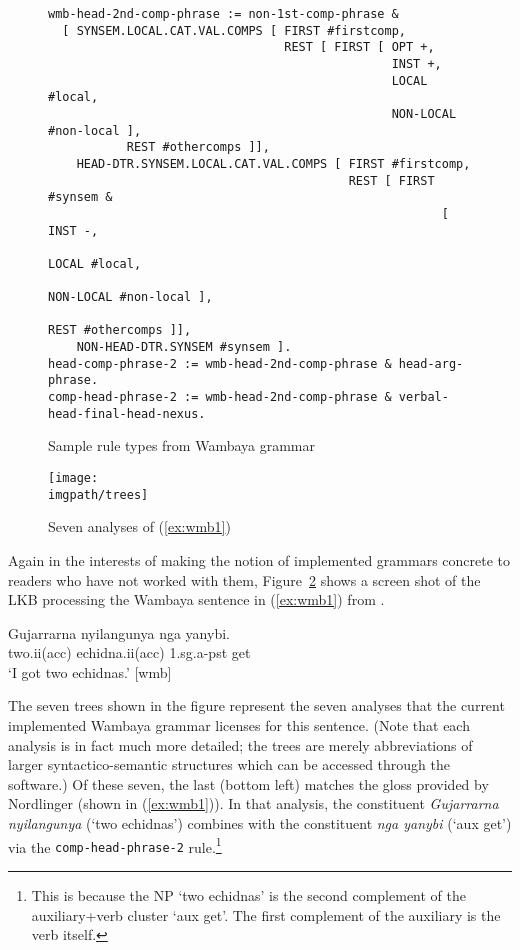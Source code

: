 \begin{figure}
\centering\footnotesize
\begin{verbatim}
wmb-head-2nd-comp-phrase := non-1st-comp-phrase & 
  [ SYNSEM.LOCAL.CAT.VAL.COMPS [ FIRST #firstcomp, 
                                 REST [ FIRST [ OPT +, 
                                                INST +, 
                                                LOCAL #local, 
                                                NON-LOCAL #non-local ], 
           REST #othercomps ]], 
    HEAD-DTR.SYNSEM.LOCAL.CAT.VAL.COMPS [ FIRST #firstcomp, 
                                          REST [ FIRST #synsem & 
                                                       [ INST -, 
                                                         LOCAL #local, 
                                                         NON-LOCAL #non-local ], 
                                                         REST #othercomps ]], 
    NON-HEAD-DTR.SYNSEM #synsem ]. 
head-comp-phrase-2 := wmb-head-2nd-comp-phrase & head-arg-phrase. 
comp-head-phrase-2 := wmb-head-2nd-comp-phrase & verbal-head-final-head-nexus.
\end{verbatim}
\caption{Sample rule types from Wambaya grammar}
\label{fig:hcp}
\end{figure}


\begin{figure}
\centering
\texttt{[image: \\imgpath/trees]}
\caption{Seven analyses of (\ref{ex:wmb1})}
\label{fig:lkb}
\end{figure}

Again in the interests of making the notion of implemented grammars
concrete to readers who have not worked with them, Figure~\ref{fig:lkb}
shows a screen shot of the LKB processing the Wambaya sentence
in (\ref{ex:wmb1}) from \citet[75]{Nordlinger:98a}.

\glossSTDmode
\parbox{\textwidth}{
\begin{exe}
\ex\label{ex:wmb1} \gll
Gujarrarna nyilangunya nga yanybi.\\
two.{\sc ii(acc)} echidna.{\sc ii(acc)} 1.{\sc sg.a-pst} get\\
`I got two echidnas.' [wmb]
\end{exe}
}


The seven trees shown in the figure represent the seven analyses that
the current implemented Wambaya grammar licenses for this sentence.
(Note that each analysis is in fact much more detailed; the trees are
merely abbreviations of larger syntactico-semantic structures which
can be accessed through the software.)  Of these seven, the last
(bottom left) matches the gloss provided by Nordlinger (shown in
(\ref{ex:wmb1})).  In that analysis, the constituent {\it Gujarrarna
  nyilangunya} (`two echidnas') combines with the constituent {\it nga
  yanybi} (`{\sc aux} get') via the {\tt\small  comp-head-phrase-2}
rule.\footnote{This is because the NP `two echidnas' is the second
  complement of the auxiliary+verb cluster `{\sc aux} get'.  The first
  complement of the auxiliary is the verb itself.}



